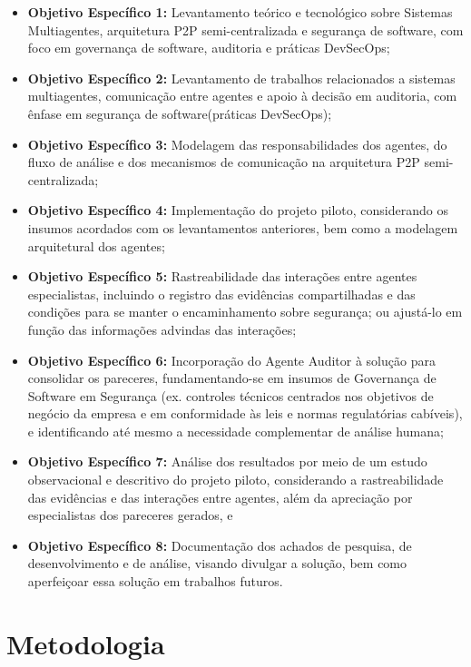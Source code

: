 \begin{itemize}
    \item \textbf{Objetivo Específico 1:} Levantamento teórico e tecnológico sobre Sistemas Multiagentes, arquitetura P2P semi-centralizada e segurança de software, com foco em governança de software, auditoria e práticas DevSecOps;
    \item \textbf{Objetivo Específico 2:} Levantamento de trabalhos relacionados a sistemas multiagentes, comunicação entre agentes e apoio à decisão em auditoria, com ênfase em segurança de software(práticas DevSecOps);
    \item \textbf{Objetivo Específico 3:} Modelagem das responsabilidades dos agentes, do fluxo de análise e dos mecanismos de comunicação na arquitetura P2P semi-centralizada;
    \item \textbf{Objetivo Específico 4:} Implementação do projeto piloto, considerando os insumos acordados com os levantamentos anteriores, bem como a modelagem arquitetural dos agentes;
    \item \textbf{Objetivo Específico 5:} Rastreabilidade das interações entre agentes especialistas, incluindo o registro das evidências compartilhadas e das condições para se manter o encaminhamento sobre segurança; ou ajustá-lo em função das informações advindas das interações;
    \item \textbf{Objetivo Específico 6:} Incorporação do Agente Auditor à solução para consolidar os pareceres, fundamentando-se em insumos de Governança de Software em Segurança (ex. controles técnicos centrados nos objetivos de negócio da empresa e em conformidade às leis e normas regulatórias cabíveis), e identificando até mesmo a necessidade complementar de análise humana;
    \item \textbf{Objetivo Específico 7:} Análise dos resultados por meio de um estudo observacional e descritivo do projeto piloto, considerando a rastreabilidade das evidências e das interações entre agentes, além da apreciação por especialistas dos pareceres gerados, e
    \item \textbf{Objetivo Específico 8:} Documentação dos achados de pesquisa, de desenvolvimento e de análise, visando divulgar a solução, bem como aperfeiçoar essa solução em trabalhos futuros.
\end{itemize}

\section{Metodologia}
\label{1-metodologia}

